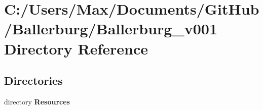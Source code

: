 \section{C\+:/\+Users/\+Max/\+Documents/\+Git\+Hub/\+Ballerburg/\+Ballerburg\+\_\+v001 Directory Reference}
\label{dir_e7e2cedda4976b886a75f4a00d945b24}
\subsection*{Directories}
\begin{DoxyCompactItemize}
\item 
directory {\bf Resources}
\end{DoxyCompactItemize}
